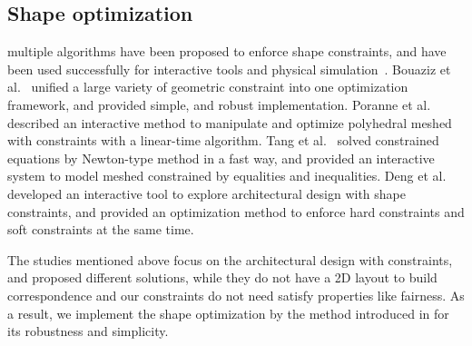 \subsection{Shape optimization}
multiple algorithms have been proposed to enforce shape constraints, and have been used successfully for interactive tools and physical simulation~\cite{Botsch:2006:PCP:1281957.1281959,Igarashi:2005:ASM:1186822.1073323}. 
Bouaziz et al.~\cite{Bouaziz:2012:SSD:2346796.2346802} unified a large variety of geometric constraint into one optimization framework, and provided simple, and robust implementation. 
Poranne et al.~\cite{Poranne2013Interactive} described an interactive method to manipulate and optimize polyhedral meshed with constraints with a linear-time algorithm. 
Tang et al.~\cite{Tang:2014:FPM:2601097.2601213} solved constrained equations by Newton-type method in a fast way, and provided an interactive system to model meshed constrained by equalities and inequalities. 
Deng et al.~\cite{Deng2015} developed an interactive tool to explore architectural design with shape constraints, and provided an optimization method to enforce hard constraints and soft constraints at the same time. 

The studies mentioned above focus on the architectural design with constraints, and proposed different solutions, while they do not have a 2D layout to build correspondence and our constraints do not need satisfy properties like fairness. As a result, we implement the shape optimization by the method introduced in \cite{Bouaziz:2012:SSD:2346796.2346802} for its robustness and simplicity.



